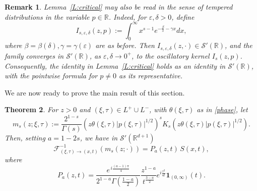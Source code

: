 \documentclass[11pt,letter]{amsart}
\def \R {\mathbb{R}}
\def \G{\Gamma}
\numberwithin{equation}{section}
\newcommand{\ve}{\varepsilon}
\newtheorem{theorem}{Theorem}[section]
\newtheorem{remark}[theorem]{Remark}
\numberwithin{equation}{section}
\begin{document}
\begin{remark}\label{R:critical}
Lemma~\ref{L:critical} may also be read in the sense of tempered
distributions in the variable $p\in \R$.
Indeed, for $\varepsilon,\delta>0$, define
\[
I_{s,\varepsilon,\delta}(z,p)
:= \int_0^\infty x^{s-1} e^{-\frac{\beta}x - \gamma x} dx,
\]
where $\beta = \beta(\delta), \gamma = \gamma(\ve)$ are as before.
Then $I_{s,\varepsilon,\delta}(z,\cdot)\in\mathscr S'(\mathbb R)$, and
the family converges in $\mathscr S'(\mathbb R)$, as
$\varepsilon,\delta\to0^+$, to the oscillatory kernel $I_s(z,p)$.
Consequently, the identity in Lemma~\ref{L:critical} holds as an identity
in $\mathscr S'(\mathbb R)$, with the pointwise formula for $p\neq0$
as its representative.
\end{remark}

We are now ready to prove the main result of this section.

\begin{theorem}\label{T:invFT}
For $z>0$ and $(\xi,\tau)\in L^+\cup L^-$, with $\theta(\xi,\tau)$ as in \eqref{phase}, let
\begin{equation}\label{ms}
m_s(z;\xi,\tau) := \frac{2^{1-s}}{ \G(s)} \left(z \theta(\xi,\tau)  |p(\xi,\tau)|^{1/2}\right)^s K_{s}\left(z \theta(\xi,\tau)  |p(\xi,\tau)|^{1/2}\right).
\end{equation}
Then, setting $a = 1-2s$, we have in $\mathscr S'(\R^{d+1})$
\begin{equation}\label{invFTFs}
\mathscr F^{-1}_{(\xi,\tau)\to (x,t)}(m_s(z;\cdot))
=
P_a(z,t)\,S(x,t),
\end{equation}
where  
\begin{equation}\label{Poi}
P_a(z,t)
=
\frac{e^{\,i\frac{(a-1)\pi}{4}}}{2^{1-a}\Gamma\!\left(\frac{1-a}{2}\right)}
\frac{z^{1-a}}{t^{\frac{3-a}{2}}}
e^{i\frac{z^2}{4t}}\mathbf 1_{(0,\infty)}(t).
\end{equation}
\end{theorem}
\end{document}
